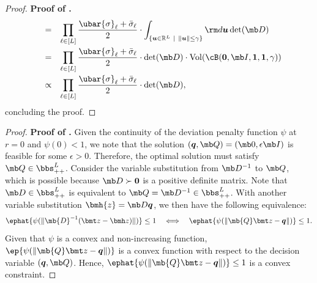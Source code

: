\documentclass[opre, blindrev]{informs4}
\newcommand{\1}[1]{\mathds{1}{\left(#1\right)}}
\begin{document}
\begin{appendices}
\begin{proof}{\bf Proof of .}
$$\begin{array}{rcl}
& = & \displaystyle \prod_{\ell \in [L]} \frac{\ubar{\sigma}_{\ell} + \bar{\sigma}_{\ell}}{2} \cdot \int_{\{ \bm u \in \mathbb{R}^L ~|~ \| \bm u\| \leq \gamma \}} {\rm d} \bm u  \det(\mb D) \\[5mm]
& = & \displaystyle \prod_{\ell \in [L]} \frac{\ubar{\sigma}_{\ell} + \bar{\sigma}_{\ell}}{2} \cdot \det(\mb D) \cdot \mathrm{Vol}(\cB(\bm 0, \mb I, \bm 1, \bm 1,\gamma)) \\[5mm]
& \propto & \displaystyle \prod_{\ell \in [L]} \frac{\ubar{\sigma}_{\ell} + \bar{\sigma}_{\ell}}{2} \cdot \det(\mb D),
\end{array}
$$
concluding the proof.
\hfill \Halmos
\end{proof}
\vspace{3mm}

\begin{proof}{\bf Proof of .} 
Given the continuity of the deviation penalty function $\psi$ at $r=0$ and $\psi(0)<1$, we note that the solution $(\bm q, \mb Q) = (\mb 0, \epsilon \mb I)$ is feasible for some $\epsilon >0$. Therefore, the optimal solution must satisfy  $\mb Q \in \bbs^L_{++}$.  Consider the variable substitution from $\mb D^{-1}$ to  $\mb Q$, which is possible because $\mb D  \succ \bm 0$ is a positive definite matrix. Note that $\mb D \in  \bbs^{L}_{++}$ is equivalent to $\mb Q = \mb D^{-1} \in \bbs^{L}_{++}$. With another variable substitution $\bmh{z} = \mb D\bm{q}$, we then have the following equivalence:
$$
\ephat{\psi(\|\mb{D}^{-1}( \bmt z - \bmh z) \|)} \leq 1 
~~~\Longleftrightarrow~~~
\ephat{\psi(\|\mb{Q} \bmt z - \bm q \|)} \leq 1.
$$
Given that $\psi$ is a convex and non-increasing function, $\ep{\psi(\|\mb{Q} \bmt z - \bm q \|)}$ is a convex function with respect to the decision variable $(\bm q,\mb Q)$. Hence, $\ephat{\psi(\|\mb{Q} \bmt z - \bm q \|)} \leq 1$ is a convex constraint.


\end{proof}
\end{appendices}
\end{document}
